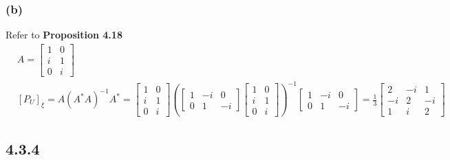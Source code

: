 \documentclass{article}
\begin{document}
\subsubsection*{(b)}
Refer to \textbf{Proposition 4.18}
\begin{equation*}
    \begin{split}
        &A = \begin{bmatrix}
            1 & 0 \\
            i & 1 \\
            0 & i 
        \end{bmatrix}\\
        &[P_U]_\xi = A(A^*A)^{-1}A^* = \begin{bmatrix}
            1 & 0 \\
            i & 1 \\
            0 & i 
        \end{bmatrix} (\begin{bmatrix}
            1 & -i & 0  \\
            0 & 1 & -i 
        \end{bmatrix} \begin{bmatrix}
            1 & 0 \\
            i & 1 \\
            0 & i 
        \end{bmatrix})^{-1} \begin{bmatrix}
            1 & -i & 0  \\
            0 & 1 & -i 
        \end{bmatrix} = \frac{1}{3}\begin{bmatrix}
            2 & -i & 1  \\
            -i & 2 & -i  \\
            1 & i & 2 
        \end{bmatrix}
    \end{split}
\end{equation*}

\subsection*{4.3.4}
\end{document}
